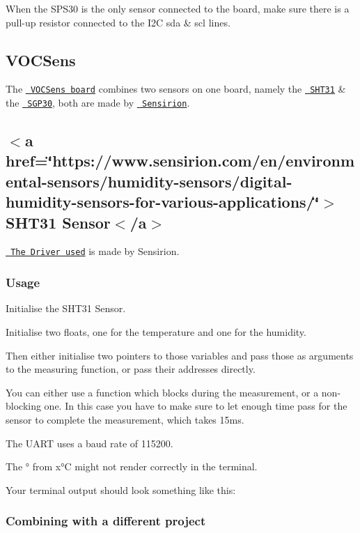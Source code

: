 When the S\+P\+S30 is the only sensor connected to the board, make sure there is a pull-\/up resistor connected to the I2C sda \& scl lines.\hypertarget{autotoc_md17_autotoc_md26}{}\subsection{V\+O\+C\+Sens}\label{autotoc_md17_autotoc_md26}
The \href{https://www.glyn.de/Produkte/Sensoren/VOCSens}{\texttt{ V\+O\+C\+Sens board}} combines two sensors on one board, namely the \href{https://www.sensirion.com/en/environmental-sensors/humidity-sensors/digital-humidity-sensors-for-various-applications/}{\texttt{ S\+H\+T31}} \& the \href{https://www.sensirion.com/de/umweltsensoren/gassensoren/multipixel-gassensoren/}{\texttt{ S\+G\+P30}}, both are made by \href{https://www.sensirion.com/en/}{\texttt{ Sensirion}}.\hypertarget{autotoc_md17_autotoc_md27}{}\subsection{$<$a href=\char`\"{}https\+://www.\+sensirion.\+com/en/environmental-\/sensors/humidity-\/sensors/digital-\/humidity-\/sensors-\/for-\/various-\/applications/\char`\"{}$>$\+S\+H\+T31 Sensor$<$/a$>$}\label{autotoc_md17_autotoc_md27}
\href{https://github.com/Sensirion/embedded-sht}{\texttt{ The Driver used}} is made by Sensirion.\hypertarget{autotoc_md17_autotoc_md28}{}\subsubsection{Usage}\label{autotoc_md17_autotoc_md28}
Initialise the S\+H\+T31 Sensor.

Initialise two floats, one for the temperature and one for the humidity.

Then either initialise two pointers to those variables and pass those as arguments to the measuring function, or pass their addresses directly.

You can either use a function which blocks during the measurement, or a non-\/blocking one. In this case you have to make sure to let enough time pass for the sensor to complete the measurement, which takes 15ms.

The U\+A\+RT uses a baud rate of 115200.

The ° from x°C might not render correctly in the terminal.

Your terminal output should look something like this\+: 
\begin{DoxyCode}{0}
\end{DoxyCode}
\hypertarget{autotoc_md17_autotoc_md29}{}\subsubsection{Combining with a different project}\label{autotoc_md17_autotoc_md29}

